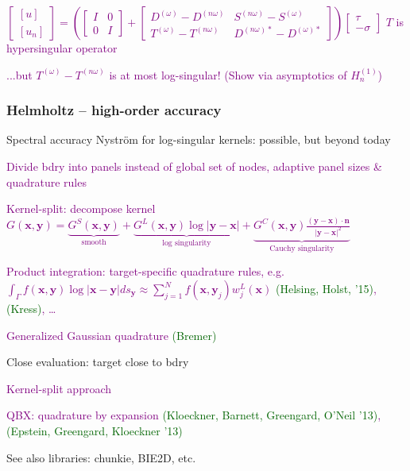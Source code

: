 \documentclass[t]{beamer}
\newcommand{\ft}[1]{\frametitle{#1}}
\newcommand{\mbf}[1]{{\bm #1}}           %
\newcommand{\who}[1]{{\scriptsize \textcolor{darkgreen}{(#1)}}}  %
\newcommand{\com}[1]{{\scriptsize \textcolor{purple}{#1}}}      %
\newcommand{\sg}{\vspace{1ex}}
\newcommand{\xx}{\mbf{x}}
\newcommand{\yy}{\mbf{y}}
\begin{document}
\begin{noframe}
  \com{$\begin{bmatrix} [u] \\ [u_n] \end{bmatrix}  = \left( \begin{bmatrix} I & 0 \\ 0 & I \end{bmatrix} + \begin{bmatrix} D^{(\omega)} - D^{(n\omega)} & S^{(n\omega)} - S^{(\omega)}\\ T^{(\omega)} - T^{(n\omega)}& D^{(n\omega)\ast} - D^{(\omega)\ast}\end{bmatrix} \right) \begin{bmatrix} \tau \\ -\sigma \end{bmatrix}$ \quad $T$ is hypersingular operator }
\pause

  \com{ ...but $T^{(\omega)} - T^{(n\omega)}$ is at most log-singular! \smiley\; (Show via asymptotics of $H_n^{(1)}$)}

\end{noframe}

\begin{frame}\ft{Helmholtz -- high-order accuracy}


  Spectral accuracy Nystr\"om for log-singular kernels: possible, but beyond today
    \sg
\pause

    \com{Divide bdry into panels instead of global set of nodes, adaptive panel sizes \& quadrature rules}
\pause

    \com{Kernel-split: decompose kernel $G(\xx, \yy) = \underbrace{G^S(\xx, \yy)}_{\text{smooth}} + \underbrace{G^L(\xx, \yy)\log|\yy - \xx|}_{\text{log singularity}} + \underbrace{G^C(\xx, \yy) \frac{(\yy - \xx) \cdot \mathbf{n}}{|\yy - \xx|^2}}_{\text{Cauchy singularity}} $}
\pause

    \com{Product integration: target-specific quadrature rules, e.g.\ $\int_{\Gamma}f(\xx, \yy)\log|\xx - \yy| ds_{\yy} \approx \sum_{j = 1}^N f(\xx, \yy_j) w_j^L(\xx)  $  \who{Helsing, Holst, '15}, \who{Kress}, \ldots} 
\pause

    \com{Generalized Gaussian quadrature \who{Bremer}}
    \sg

    Close evaluation: target close to bdry %
\pause

    \com{Kernel-split approach}
\pause

    \com{QBX: quadrature by expansion \who{Kloeckner, Barnett, Greengard, O'Neil '13}, \who{Epstein, Greengard, Kloeckner '13}}

    \sg 
\pause

  See also libraries: chunkie, BIE2D, etc.\

  \end{frame}
\end{document}
